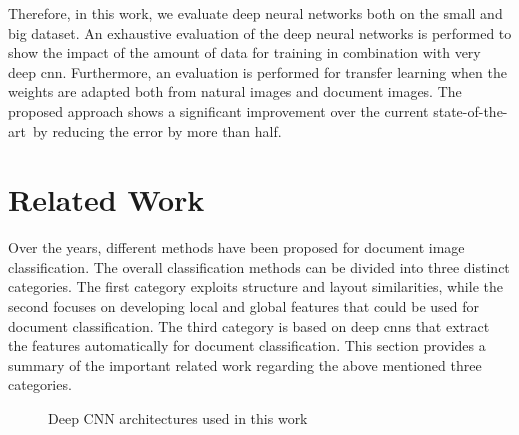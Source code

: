 \documentclass[conference]{IEEEtran}
\newcommand*{\sota}		{state-of-the-art\ }
\begin{document}
Therefore, in this work, we evaluate deep neural networks both on the small and big dataset.
An exhaustive evaluation of the deep neural networks is performed to show the impact of the amount of data for training in combination with very deep \ac{cnn}. Furthermore, an evaluation is performed for transfer learning when the weights are adapted both from natural images and document images. The proposed approach shows a significant improvement over the current \sota by reducing the error by more than half.

 
\section{Related Work}



Over the years, different methods have been proposed for document image classification. The overall classification methods can be divided into three distinct categories.
The first category exploits structure and layout similarities, while the second focuses on developing local and global features that could be used for document classification. The third category is based on deep \ac{cnn}s that extract the features automatically for document classification. This section provides a summary of the important related work regarding the above mentioned three categories.

\begin{figure*}
    \begin{subfigure}{0.22\linewidth}
        \centering
        \label{fig:alexnet}
    \end{subfigure}
    \begin{subfigure}{0.21\linewidth}
        \centering
        \label{fig:vgg}
    \end{subfigure}
    \begin{subfigure}{0.36\linewidth}
        \centering
        \label{fig:googlenet}
    \end{subfigure}
    \begin{subfigure}{0.19\linewidth}
        \centering
        \label{fig:resnet}
    \end{subfigure}
    \caption{Deep CNN architectures used in this work}
    \label{fig:deepcnn}
\end{figure*}
\end{document}
